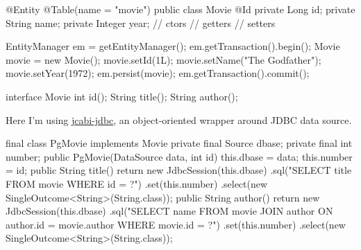 \documentclass{article}
\begin{document}

\begin{pptWide}{2}
{\small\begin{ffcode}
@Entity
@Table(name = "movie")
public class Movie {
  @Id
  private Long id;
  private String name;
  private Integer year;
  // ctors
  // getters
  // setters
}
\end{ffcode}
}
\par\columnbreak\par
{\small\begin{ffcode}
EntityManager em = getEntityManager();
em.getTransaction().begin();
Movie movie = new Movie();
movie.setId(1L);
movie.setName("The Godfather");
movie.setYear(1972);
em.persist(movie);
em.getTransaction().commit();
\end{ffcode}
}
\end{pptWide}
\par
\plush{}

\begin{pptWide}{2}
{\small\begin{ffcode}
interface Movie {
  int id();
  String title();
  String author();
}
\end{ffcode}
}
\par
Here I'm using \href{https://github.com/jcabi/jcabi-jdbc}{jcabi-jdbc},
an object-oriented wrapper around JDBC data source.
\par\columnbreak\par
{\scriptsize\begin{ffcode}
final class PgMovie implements Movie
  private final Source dbase;
  private final int number;
  public PgMovie(DataSource data, int id)
    this.dbase = data;
    this.number = id;
  public String title()
    return new JdbcSession(this.dbase)
      .sql("SELECT title FROM movie WHERE id = ?")
      .set(this.number)
      .select(new SingleOutcome<String>(String.class));
  public String author()
    return new JdbcSession(this.dbase)
      .sql("SELECT name FROM movie JOIN author ON author.id = movie.author WHERE movie.id = ?")
      .set(this.number)
      .select(new SingleOutcome<String>(String.class));
\end{ffcode}
}
\end{pptWide}
\par
\plush{}


\end{document}
